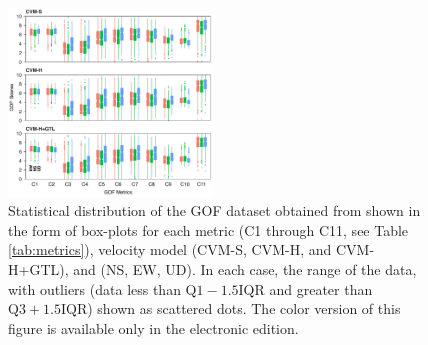 \begin{figure}[ht!]
    \centering
    \includegraphics[width=0.48\textwidth]{figures/pdf/figure-03}
    \caption{Statistical distribution of the GOF dataset obtained from \citet{Taborda_2014_BSSA} shown in the form of box-plots for each metric (C1 through C11, see Table \ref{tab:metrics}), velocity model (CVM-S, CVM-H, and CVM-H+GTL), and  (NS, EW, UD). In each case,  the range of the data, with outliers (data less than $\mathrm{Q}1 - 1.5 \mathrm{IQR}$ and greater than $\mathrm{Q}3 + 1.5 \mathrm{IQR}$) shown as scattered dots. The color version of this figure is available only in the electronic edition.}
    \label{fig:data-box-plot}
\end{figure}
